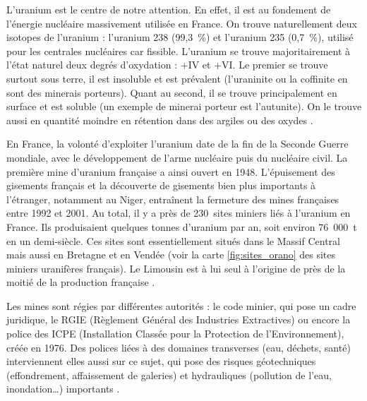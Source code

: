 \documentclass{article}
\begin{document}
L’uranium est le centre de notre attention. En effet, il est au fondement de l’énergie nucléaire massivement utilisée en France. On trouve naturellement deux isotopes de l'uranium : l'uranium 238 (99,3~\%) et l'uranium 235 (0,7~\%), utilisé pour les centrales nucléaires car fissible. L'uranium se trouve majoritairement à l'état naturel deux degrés d’oxydation : +IV et +VI. Le premier se trouve surtout sous terre, il est insoluble et est prévalent (l'uraninite ou la coffinite en sont des minerais porteurs). Quant au second, il se trouve principalement en surface et est soluble (un exemple de minerai porteur est l'autunite). On le trouve aussi en quantité moindre en rétention dans des argiles ou des oxydes \cite{descostes_introduction_2020}.


En France, la volonté d’exploiter l’uranium date de la fin de la Seconde Guerre mondiale, avec le développement de l'arme nucléaire puis du nucléaire civil. La première mine d’uranium française a ainsi ouvert en 1948. L’épuisement des gisements français et la découverte de gisements bien plus importants à l’étranger, notamment au Niger, entraînent la fermeture des mines françaises entre 1992 et 2001. Au total, il y a près de 230~sites miniers liés à l’uranium en France. Ils produisaient quelques tonnes d'uranium par an, soit environ 76~000~t en un demi-siècle. Ces sites sont essentiellement situés dans le Massif Central mais aussi en Bretagne et en Vendée (voir la carte \ref{fig:sites_orano} des sites miniers uranifères français). Le Limousin est à lui seul à l’origine de près de la moitié de la production française \cite{descostes_introduction_2020}.

Les mines sont régies par différentes autorités : le code minier, qui pose un cadre juridique, le RGIE (Règlement Général des Industries Extractives) ou encore la police des ICPE (Installation Classée pour la Protection de l’Environnement), créée en 1976. Des polices liées à des domaines transverses (eau, déchets, santé) interviennent elles aussi sur ce sujet, qui pose des risques géotechniques (effondrement, affaissement de galeries) et hydrauliques (pollution de l'eau, inondation…) importants \cite{ledoux_notions_2020}\cite{dublineau_gestion_2020}\cite{raimbault_mine_2020}.
\end{document}
